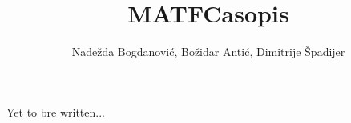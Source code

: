 \documentclass[a4paper,10pt]{article}
\title{MATFCasopis}
\author{Nadežda Bogdanović, Božidar Antić, Dimitrije Špadijer}
\begin{document}
\maketitle

Yet to bre written...

\medskip


\end{document}
